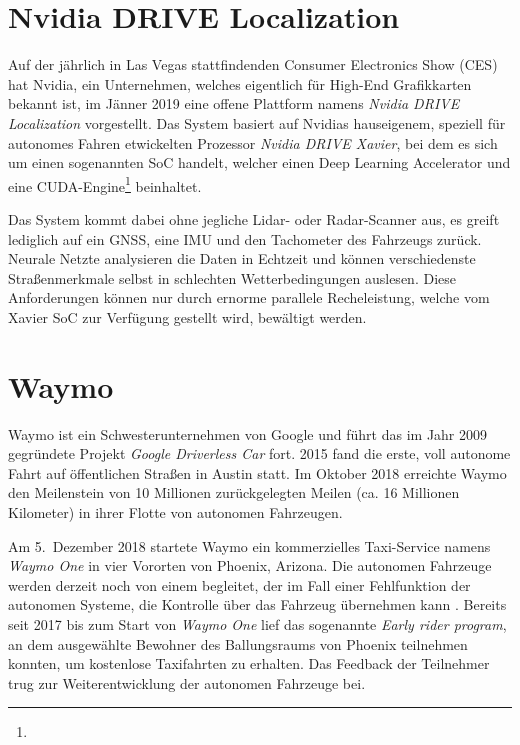 \section{Nvidia DRIVE Localization}

Auf der jährlich in Las Vegas stattfindenden Consumer Electronics Show (CES) hat Nvidia, ein Unternehmen, welches eigentlich für High-End Grafikkarten bekannt ist, im Jänner 2019 eine offene Plattform namens \emph{Nvidia DRIVE Localization} vorgestellt. Das System basiert auf Nvidias hauseigenem, speziell für autonomes Fahren etwickelten Prozessor \emph{Nvidia DRIVE Xavier}, bei dem es sich um einen sogenannten \ac{SoC} handelt, welcher einen Deep Learning Accelerator und eine CUDA-Engine\footnote{} beinhaltet. 

Das System kommt dabei ohne jegliche \acs{Lidar}- oder \acs{Radar}-Scanner aus, es greift lediglich auf ein \ac{GNSS}, eine \ac{IMU} und den Tachometer des Fahrzeugs zurück. Neurale Netzte analysieren die Daten in Echtzeit und können verschiedenste Straßenmerkmale selbst in schlechten Wetterbedingungen auslesen. Diese Anforderungen können nur durch ernorme parallele Recheleistung, welche vom Xavier \ac{SoC} zur Verfügung gestellt wird, bewältigt werden. 


\section{Waymo}

Waymo ist ein Schwesterunternehmen von Google und führt das im Jahr 2009 gegründete Projekt \emph{Google Driverless Car} fort. 2015 fand die erste, voll autonome Fahrt auf öffentlichen Straßen in Austin statt. Im Oktober 2018 erreichte Waymo den Meilenstein von 10 Millionen zurückgelegten Meilen (ca. 16 Millionen Kilometer) in ihrer Flotte von autonomen Fahrzeugen.

Am 5.\ Dezember 2018 startete Waymo ein kommerzielles Taxi-Service namens \emph{Waymo One} in vier Vororten von Phoenix, Arizona. Die autonomen Fahrzeuge werden derzeit noch von einem  begleitet, der im Fall einer Fehlfunktion der autonomen Systeme, die Kontrolle über das Fahrzeug übernehmen kann . Bereits seit 2017 bis zum Start von \emph{Waymo One} lief das sogenannte \emph{Early rider program}, an dem ausgewählte Bewohner des Ballungsraums von Phoenix teilnehmen konnten, um kostenlose Taxifahrten zu erhalten. Das Feedback der Teilnehmer trug zur Weiterentwicklung der autonomen Fahrzeuge bei.


